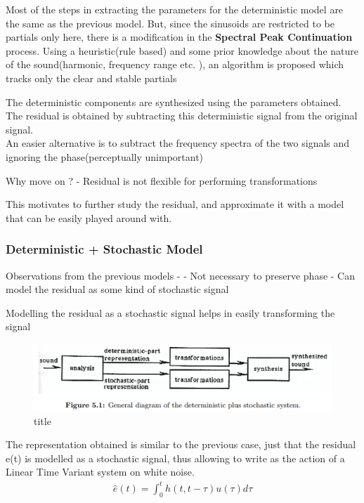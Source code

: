 \documentclass[11pt]{article}
\makeatletter
\def\maxwidth{\ifdim\Gin@nat@width>\linewidth\linewidth
    \else\Gin@nat@width\fi}
\let\Oldincludegraphics\includegraphics
\renewcommand{\includegraphics}[1]{\Oldincludegraphics[width=.8\maxwidth]{#1}}
\makeatother
\begin{document}
    Most of the steps in extracting the parameters for the deterministic
model are the same as the previous model. But, since the sinusoids are
restricted to be partials only here, there is a modification in the
\textbf{Spectral Peak Continuation} process. Using a heuristic(rule
based) and some prior knowledge about the nature of the sound(harmonic,
frequency range etc. ), an algorithm is proposed which tracks only the
clear and stable partials

    The deterministic components are synthesized using the parameters
obtained. The residual is obtained by subtracting this deterministic
signal from the original signal.\\
An easier alternative is to subtract the frequency spectra of the two
signals and ignoring the phase(perceptually unimportant)

    Why move on ? - Residual is not flexible for performing transformations

This motivates to further study the residual, and approximate it with a
model that can be easily played around with.

    \subsubsection{Deterministic + Stochastic
Model}\label{deterministic-stochastic-model}

    Observations from the previous models - - Not necessary to preserve
phase - Can model the residual as some kind of stochastic signal

Modelling the residual as a stochastic signal helps in easily
transforming the signal

\begin{figure}
\centering
\includegraphics{fig_6.png}
\caption{title}
\end{figure}

    The representation obtained is similar to the previous case, just that
the residual e(t) is modelled as a stochastic signal, thus allowing to
write as the action of a Linear Time Variant system on white noise.\\

\begin{align}
\hat e(t) = \int_{0}^{t}h(t,t-\tau)u(\tau)d \tau
\end{align}
\end{document}
